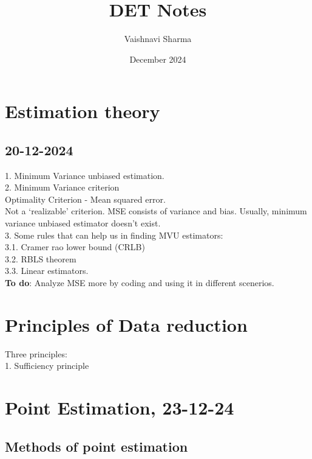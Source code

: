 \documentclass{article}
\title{DET Notes}
\author{Vaishnavi Sharma}
\date{December 2024}
\begin{document}
\maketitle

\section{Estimation theory}
\subsection{20-12-2024}
1. Minimum Variance unbiased estimation.\\
2. Minimum Variance criterion \\
Optimality Criterion - Mean squared error. \\
Not a `realizable' criterion.
MSE consists of variance and bias. Usually, minimum variance unbiased estimator doesn't exist.\\
3. Some rules that can help us in finding MVU estimators:\\
3.1. Cramer rao lower bound (CRLB)\\
3.2. RBLS theorem\\
3.3. Linear estimators.\\
\textbf{To do}: Analyze MSE more by coding and using it in different scenerios.

\section{Principles of Data reduction}
Three principles:\\
1. Sufficiency principle
\section{Point Estimation, 23-12-24}
\subsection{Methods of point estimation}
\end{document}
